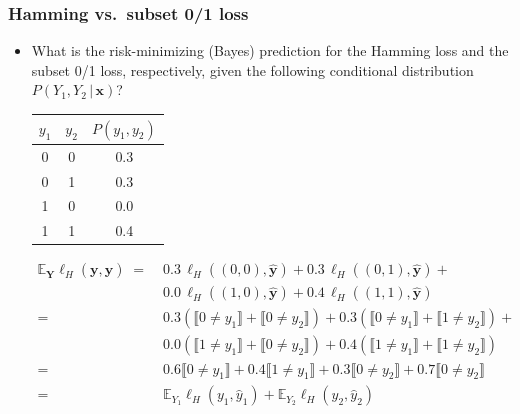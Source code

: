 \documentclass[]{beamer}
\renewcommand{\Pr}{P}
\renewcommand{\vec}[1]{\boldsymbol{#1}}
\newcommand{\by}{\boldsymbol{y}}
\newcommand{\assert}[1]{\llbracket #1 \rrbracket}
\renewcommand{\emph}[1]{\textbf{\color{putblue}#1}}
\begin{document}
\begin{frame}
\frametitle{Hamming vs.\ subset 0/1 loss}
\begin{itemize}
\item What is the risk-minimizing (Bayes) prediction for the Hamming loss and the subset 0/1 loss, respectively, given the following conditional distribution $\Pr(Y_1,Y_2 \, \vert \, \vec{x})$?

\medskip

\begin{center}
\begin{tabular}{ccc}
\toprule
$y_1$ & $y_2$ & $\Pr(y_1,y_2)$  \\
\midrule
0   & 0   & 0.3    \\
0   & 1   & 0.3        \\
1   & 0   & 0.0       \\
1   & 1   & 0.4     \\
\bottomrule
\end{tabular}
\end{center}

\small
\begin{align*}
\mathbb{E}_{\mathbf{Y}} \ell_H(\by, \hat{\by}) \; = \; & 0.3 \, \ell_H((0,0),\hat{\by}) +  0.3 \, \ell_H((0,1),\hat{\by}) + \\
& 0.0 \, \ell_H((1,0),\hat{\by}) +  0.4 \, \ell_H((1,1),\hat{\by}) \\  
= \; & 0.3( \assert{0 \neq y_1} + \assert{0 \neq y_2}) + 
0.3( \assert{0 \neq y_1} + \assert{1 \neq y_2}) + \\
& 0.0( \assert{1 \neq y_1} + \assert{0 \neq y_2}) +
0.4( \assert{1 \neq y_1} + \assert{1 \neq y_2}) \\
= \; & 0.6 \assert{0 \neq y_1} + 0.4 \assert{1 \neq y_1} + 0.3 \assert{0 \neq y_2} + 0.7 \assert{0 \neq y_2} \\
= \; & \mathbb{E}_{Y_1} \ell_H(y_1, \hat{y}_1) + \mathbb{E}_{Y_2} \ell_H(y_2, \hat{y}_2)
\end{align*}



\end{itemize}
\end{frame}
\end{document}
